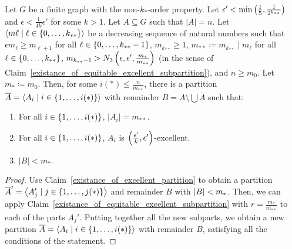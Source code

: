 
    \lemma[Claim 5.14.1a]\label{existance_of_excellent_partition_with_equal_size}
        Let $G$ be a finite graph with the non-$k_{*}$-order property.
        Let $\epsilon' < \min \left( \frac{1}{5}, \frac{1}{2^{k_{**}}} \right)$ and $\epsilon < \frac{1}{4k} \epsilon'$ for some $k > 1$.
        Let $A \subseteq G$ such that $|A| = n$.
        Let $\left< m\ell \mid \ell \in \left\{ 0, \dots, k_{**} \right\} \right>$ be a decreasing sequence of natural numbers such that
        $\epsilon m_{\ell} \geq m_{\ell+1}$ for all $\ell \in \left\{ 0, \dots, k_{**}-1 \right\}$, $m_{k_{**}} \geq 1$,
        $m_{**} \coloneq m_{k_{**}} \mid m_\ell$ for all $\ell \in \left\{ 0, \dots, k_{**} \right\}$,
        $m_{k_{**}-1} > N_3\left( \epsilon, \epsilon', \frac{m_*}{m_{**}} \right)$
        (in the sense of Claim~\ref{existance_of_equitable_excellent_subpartition}), and $n \geq m_0$.
        Let $m_* \coloneq m_0$.
        Then, for some $i(*) \leq \frac{n}{m_{**}}$, there is a partition $\overline{A} = \left< A_i \mid i \in \left\{ 1, \dots, i(*) \right\} \right>$
        with remainder $B = A \setminus \bigcup \overline{A}$ such that:
        \begin{enumerate}[label=(\alph*), ref=\alph*]
            \item \label{itm:5.14.1a.a} For all $i \in \left\{ 1, \dots, i(*) \right\}$, $|A_i| = m_{**}$.
            \item \label{itm:5.14.1a.c} For all $i \in \left\{ 1, \dots, i(*) \right\}$, $A_i$ is $\left( \frac{\epsilon'}{k}, \epsilon' \right)$-excellent.
            \item \label{itm:5.14.1a.d} $|B| < m_*$.
        \end{enumerate}
        \begin{proof}
            Use Claim~\ref{existance_of_excellent_partition} to obtain a partition
            $\overline{A}' = \left< A_j' \mid j \in \left\{ 1, \dots, j(*) \right\} \right>$ and remainder $B$ with $\left| B \right| < m_*$.
            Then, we can apply Claim~\ref{existance_of_equitable_excellent_subpartition} with $r = \frac{m_*}{m_{**}}$ to each of
            the parts $A_j'$.
            Putting together all the new subparts, we obtain a new partition $\overline{A} = \left< A_i \mid i \in \left\{ 1, \dots, i(*) \right\} \right>$
            with remainder $B$, satisfying all the conditions of the statement.
        \end{proof}

